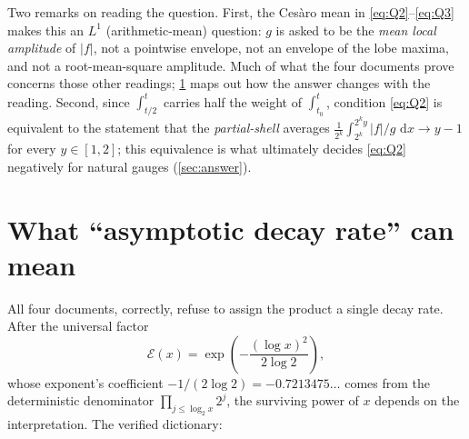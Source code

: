 \documentclass[11pt,oneside]{article}
\theoremstyle{definition}
\theoremstyle{remark}
\newcommand{\dd}{\,\mathrm d}
\begin{document}
Two remarks on reading the question.  First, the Ces\`aro mean in
\eqref{eq:Q2}--\eqref{eq:Q3} makes this an $L^1$ (arithmetic-mean) question:
$g$ is asked to be the \emph{mean local amplitude} of $|f|$, not a pointwise
envelope, not an envelope of the lobe maxima, and not a root-mean-square
amplitude.  Much of what the four documents prove concerns those other
readings; \cref{sec:interpretations} maps out how the answer changes with
the reading.  Second, since $\int_{t/2}^{t}$ carries half the weight of
$\int_{t_0}^{t}$, condition \eqref{eq:Q2} is equivalent to the statement
that the \emph{partial-shell} averages
$\frac{1}{2^k}\int_{2^k}^{2^ky}|f|/g\,\dd x\to y-1$ for every
$y\in[1,2]$; this equivalence is what ultimately decides \eqref{eq:Q2}
negatively for natural gauges (\cref{sec:answer}).

\section{What ``asymptotic decay rate'' can mean}
\label{sec:interpretations}

All four documents, correctly, refuse to assign the product a single decay
rate.  After the universal factor
\[
 \mathcal E(x)=\exp\!\left(-\frac{(\log x)^2}{2\log2}\right),
\]
whose exponent's coefficient $-1/(2\log2)=-0.7213475\ldots$ comes from the
deterministic denominator $\prod_{j\le\log_2x}2^j$, the surviving power of
$x$ depends on the interpretation.  The verified dictionary:
\end{document}
